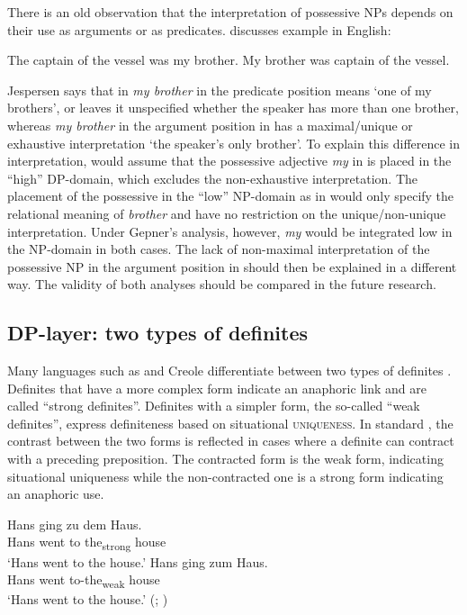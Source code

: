\documentclass[output=paper]{langscibook}
\begin{document}
There is an old observation that the interpretation of possessive NPs depends on their use as arguments or as predicates. \cite{Jespersen1965} discusses example  in English:

\ea \label{ex:6} \ea The captain of the vessel was my brother. \label{ex:6a}
\ex My brother was captain of the vessel.\label{ex:6b}
\z \z

\noindent Jespersen says that in  \textit{my brother} in the predicate position means `one of my brothers', or leaves it unspecified whether the speaker has more than one brother, whereas \textit{my brother} in the argument position in  has a maximal/unique or exhaustive interpretation `the speaker’s only brother'. To explain this difference in interpretation, \cite{Kagan.Pereltsvaig2014} would assume that the possessive adjective \textit{my} in  is placed in the ``high'' DP-domain, which excludes the non-ex\-haustive interpretation. The placement of the possessive in the ``low'' NP-domain as in  would only specify the relational meaning of \textit{brother} and have no restriction on the unique/non-unique interpretation. Under Gepner's analysis, however, \textit{my} would be integrated low in the NP-domain in both cases. The lack of non-maximal interpretation of the possessive NP in the argument position in  should then be explained in a different way. The validity of both analyses should be compared in the future research.

\subsection{DP-layer: two types of definites}

Many languages such as  and  Creole differentiate between two types of definites \citep{Lobner2011,Schwarz2009,Schwarz2013,Jenks2015}. Definites that have a more complex form indicate an anaphoric link and are called ``strong definites''. Definites with a simpler form, the so-called ``weak definites'', express definiteness based on situational \textsc{uniqueness}. In standard , the contrast between the two forms is reflected in cases where a definite can contract with a preceding preposition. The contracted form is the weak form, indicating situational uniqueness while the non-contracted one is a strong form indicating an anaphoric use.


\ea \label{ex:7}
\ea
\gll Hans ging zu dem Haus. \\
    Hans went to the\textsubscript{strong} house\\ %
\glt `Hans went to the house.' \label{ex:7a}
\ex \gll Hans ging zum Haus. \\
 Hans went to-the\textsubscript{weak} house\\ %
\glt `Hans went to the house.' \hfill (; \citealt[12]{Schwarz2009}) \label{ex:7b}
\z \z
\end{document}
